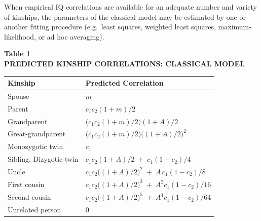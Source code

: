 ﻿\documentclass[12pt]{article}
\begin{document}
When empirical IQ correlations are available for an adequate number and variety of kinships, the parameters of the classical model may be estimated by one or another fitting procedure (e.g.\ least squares, weighted least squares, maximum-likelihood, or ad hoc averaging).

\begin{center}
\textbf{Table 1}\\
\textbf{PREDICTED KINSHIP CORRELATIONS: CLASSICAL MODEL}
\end{center}
\begin{center}
\begin{tabular}{l l}
\hline
Kinship & Predicted Correlation \\
\hline
Spouse & $m$ \\
Parent & $c_1 c_2 (1+m)/2$ \\
Grandparent & $\big(c_1 c_2 (1+m)/2\big)(1+A)/2$ \\
Great-grandparent & $\big(c_1 c_2 (1+m)/2\big)\big((1+A)/2\big)^2$ \\
Monozygotic twin & $c_1$ \\
Sibling, Dizygotic twin & $c_1 c_2 (1+A)/2 \; + \; c_1(1-c_2)/4$ \\
Uncle & $c_1 c_2 \big((1+A)/2\big)^2 \; + \; A\, c_1 (1-c_2)/8$ \\
First cousin & $c_1 c_2 \big((1+A)/2\big)^3 \; + \; A^2 c_1 (1-c_2)/16$ \\
Second cousin & $c_1 c_2 \big((1+A)/2\big)^5 \; + \; A^4 c_1 (1-c_2)/64$ \\
Unrelated person & $0$ \\
\hline
\end{tabular}
\end{center}
\end{document}
